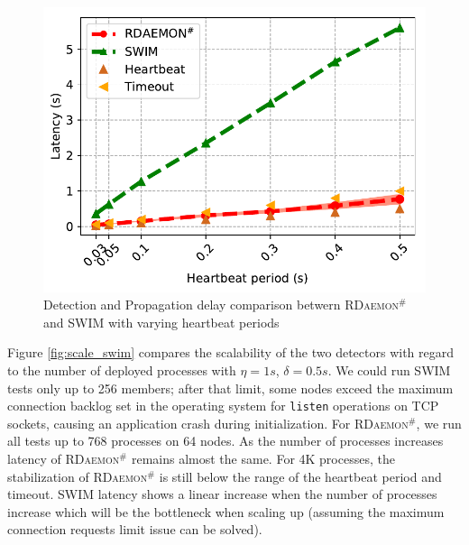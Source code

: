 \documentclass[sigconf]{acmart}
\newcommand{\ourwork}[0]{\textsc{RDaemon}\ensuremath{^\#}\xspace}
\begin{document}
\begin{figure}[h]
  \centering
  \includegraphics[width=\linewidth]{HB_prrte_swim.pdf}
  \caption{Detection and Propagation delay comparison betwern \ourwork and SWIM with varying heartbeat periods}
  \label{fig:hb_prrte_swim}
\end{figure}


Figure \ref{fig:scale_swim} compares the scalability of the two detectors with regard to the number of deployed processes with $\eta = 1s$, $\delta = 0.5s$.
We could run SWIM tests only up to 256 members; after that limit, some nodes exceed the maximum connection backlog
set in the operating system for \texttt{listen} operations on TCP sockets, causing an application crash during
initialization. For \ourwork,
we run all tests up to 768 processes on 64 nodes.
%
As the number of processes increases latency of \ourwork remains almost the same.
For 4K processes, the stabilization of \ourwork is still below the range of the heartbeat period and timeout.
SWIM latency shows a linear increase when the number of processes increase which will be the bottleneck when scaling up (assuming the maximum connection requests limit issue can be solved).
\end{document}
